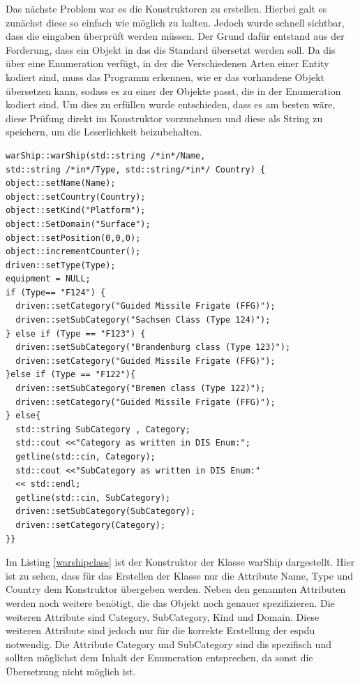 Das nächste Problem war es die Konstruktoren zu erstellen. Hierbei galt es zunächst diese so einfach wie möglich zu halten. Jedoch wurde schnell sichtbar, dass die eingaben überprüft werden müssen. Der Grund dafür entstand aus der Forderung, dass ein Objekt in das \ac{dis} Standard übersetzt werden soll. Da \ac{dis} über eine Enumeration verfügt, in der die Verschiedenen Arten einer Entity kodiert sind, muss das Programm erkennen, wie er das vorhandene Objekt übersetzen kann, sodass es zu einer der Objekte passt, die in der Enumeration kodiert sind. Um dies zu erfüllen wurde entschieden, dass es am besten wäre, diese Prüfung direkt im Konstruktor vorzunehmen und diese als String zu speichern, um die Leserlichkeit beizubehalten.   
\begin{lstlisting}[caption =Konstruktor  \glqq warShip\grqq{} Klasse ,label=warshipclass]
warShip::warShip(std::string /*in*/Name,
std::string /*in*/Type, std::string/*in*/ Country) {
object::setName(Name);
object::setCountry(Country);
object::setKind("Platform");
object::SetDomain("Surface");
object::setPosition(0,0,0);
object::incrementCounter();
driven::setType(Type);
equipment = NULL;
if (Type== "F124") {
  driven::setCategory("Guided Missile Frigate (FFG)");
  driven::setSubCategory("Sachsen Class (Type 124)");
} else if (Type == "F123") {
  driven::setSubCategory("Brandenburg class (Type 123)");
  driven::setCategory("Guided Missile Frigate (FFG)");
}else if (Type == "F122"){
  driven::setSubCategory("Bremen class (Type 122)");
  driven::setCategory("Guided Missile Frigate (FFG)");
} else{
  std::string SubCategory , Category;
  std::cout <<"Category as written in DIS Enum:";
  getline(std::cin, Category);
  std::cout <<"SubCategory as written in DIS Enum:"
  << std::endl;
  getline(std::cin, SubCategory);
  driven::setSubCategory(SubCategory);
  driven::setCategory(Category);
}}
\end{lstlisting}
Im Listing \ref{warshipclass} ist der Konstruktor der Klasse \glqq warShip\grqq{} dargestellt. Hier ist zu sehen, dass für das Erstellen der Klasse nur die Attribute \glqq Name\grqq{}, \glqq Type\grqq{} und \glqq Country\grqq{} dem Konstruktor übergeben werden. Neben den genannten Attributen werden noch weitere benötigt, die das Objekt noch genauer spezifizieren.
Die weiteren Attribute sind  \glqq Category\grqq{}, \glqq SubCategory\grqq{}, \glqq Kind\grqq{} und  \glqq Domain\grqq{}. Diese weiteren Attribute sind jedoch nur für die korrekte Erstellung der \ac{espdu} notwendig.
Die Attribute   \glqq Category\grqq{} und \glqq SubCategory\grqq{} sind \ac{dis} spezifisch und sollten möglichst dem Inhalt der Enumeration entsprechen, da sonst die Übersetzung nicht möglich ist. 
